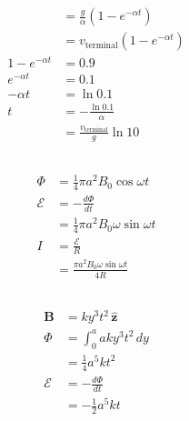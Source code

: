 \documentclass{article}
\renewcommand{\vec}[1]{\boldsymbol{\mathbf{#1}}}
\newcommand{\uvec}[1]{\hat{\vec{#1}}}
\begin{document}
\begin{align*}
                                         & = \frac{g}{\alpha} (1 - e^{-\alpha t})  \\
                                         & = v_\text{terminal} (1 - e^{-\alpha t}) \\
  1 - e^{-\alpha t}                      & = 0.9                                   \\
  e^{-\alpha t}                          & = 0.1                                   \\
  -\alpha t                              & = \ln 0.1                               \\
  t                                      & = -\frac{\ln 0.1}{\alpha}               \\
                                         & = \frac{v_\text{terminal}}{g} \ln 10
\end{align*}

\subsection{}

\begin{align*}
  \Phi        & = \frac{1}{4} \pi a^2 B_0 \cos \omega t        \\
  \mathcal{E} & = -\frac{d \Phi}{d t}                          \\
              & = \frac{1}{4} \pi a^2 B_0 \omega \sin \omega t \\
  I           & = \frac{\mathcal{E}}{R}                        \\
              & = \frac{\pi a^2 B_0 \omega \sin \omega t}{4 R}
\end{align*}

\subsection{}

\begin{align*}
  \vec{B}     & = k y^3 t^2 \,\uvec{z}       \\
  \Phi        & = \int_0^a a k y^3 t^2 \,d y \\
              & = \frac{1}{4} a^5 k t^2      \\
  \mathcal{E} & = -\frac{d \Phi}{d t}        \\
              & = -\frac{1}{2} a^5 k t
\end{align*}

\subsection{}
\end{document}
